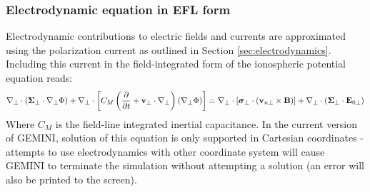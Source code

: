 \documentclass[11pt,letterpaper]{article}
\begin{document}
\subsubsection{Electrodynamic equation in EFL form}

Electrodynamic contributions to electric fields and currents are approximated using the polarization current as outlined in Section \ref{sec:electrodynamics}.  Including this current in the field-integrated form of the ionospheric potential equation reads:    
\begin{equation}
  \nabla_\perp \cdot \left( \boldsymbol{\Sigma}_\perp \cdot \nabla_\perp \Phi \right) + \nabla_\perp \cdot \left[ C_M \left( \frac{\partial}{\partial t}  + \mathbf{v}_\perp \cdot \nabla_\perp \right) \left( \nabla_\perp \Phi \right) \right]  = \nonumber \\ \nabla_\perp \cdot \left[ \boldsymbol{\sigma}_\perp \cdot \left( \mathbf{v}_{n\perp} \times \mathbf{B} \right) \right] + \nabla_\perp \cdot \left( \boldsymbol{\Sigma}_\perp \cdot \mathbf{E}_{0\perp} \right) \label{eqn:electro}
\end{equation}
Where $C_M$ is the field-line integrated inertial capacitance.  In the current version of GEMINI, solution of this equation is only supported in Cartesian coordinates - attempts to use electrodynamics with other coordinate system will cause GEMINI to terminate the simulation without attempting a solution (an error will also be printed to the screen).  
\end{document}
